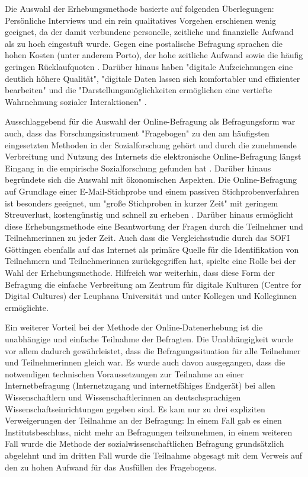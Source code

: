 Die Auswahl der Erhebungsmethode basierte auf folgenden Überlegungen: Persönliche Interviews und ein rein qualitatives Vorgehen erschienen wenig geeignet, da der damit verbundene personelle, zeitliche und finanzielle Aufwand als zu hoch eingestuft wurde. Gegen eine postalische Befragung sprachen die hohen Kosten (unter anderem Porto), der hohe zeitliche Aufwand sowie die häufig geringen Rücklaufquoten \cite{Petermann_2005}. Darüber hinaus haben "digitale Aufzeichnungen eine deutlich höhere Qualität", "digitale Daten lassen sich komfortabler und effizienter bearbeiten" und die "Darstellungsmöglichkeiten ermöglichen eine vertiefte Wahrnehmung sozialer Interaktionen" \cite{Hartung_2011}.

Ausschlaggebend für die Auswahl der Online-Befragung als Befragungsform war auch, dass das Forschungsinstrument "Fragebogen" zu den am häufigsten eingesetzten Methoden in der Sozialforschung gehört \cite{Raab-Steiner_2012} und durch die zunehmende Verbreitung und Nutzung des Internets die elektronische Online-Befragung längst Eingang in die empirische Sozialforschung gefunden hat \cite{Pannewitz_2002}. Darüber hinaus begründete sich die Auswahl mit ökonomischen Aspekten. Die Online-Befragung auf Grundlage einer E-Mail-Stichprobe und einem passiven Stichprobenverfahren ist besonders geeignet, um "große Stichproben in kurzer Zeit" \cite[:70]{Thielsch_2009} mit geringem Streuverlust, kostengünstig und schnell zu erheben \cite[:35]{Eichhorn_2004}. Darüber hinaus ermöglicht diese Erhebungsmethode eine Beantwortung der Fragen durch die Teilnehmer und Teilnehmerinnen zu jeder Zeit. Auch dass die Vergleichsstudie durch das SOFI Göttingen ebenfalls auf das Internet als primäre Quelle für die Identifikation von Teilnehmern und Teilnehmerinnen zurückgegriffen hat, spielte eine Rolle bei der Wahl der Erhebungsmethode. Hilfreich war weiterhin, dass diese Form der Befragung die einfache Verbreitung am Zentrum für digitale Kulturen (Centre for Digital Cultures) der Leuphana Universität und unter Kollegen und Kolleginnen ermöglichte.

Ein weiterer Vorteil bei der Methode der Online-Datenerhebung ist die unabhängige und einfache Teilnahme der Befragten. Die Unabhängigkeit wurde vor allem dadurch gewährleistet, dass die Befragungssituation für alle Teilnehmer und Teilnehmerinnen gleich war. Es wurde auch davon ausgegangen, dass die notwendigen technischen Voraussetzungen zur Teilnahme an einer Internetbefragung (Internetzugang und internetfähiges Endgerät) bei allen Wissenschaftlern und Wissenschaftlerinnen an deutschsprachigen Wissenschaftseinrichtungen gegeben sind. Es kam nur zu drei expliziten Verweigerungen der Teilnahme an der Befragung: In einem Fall gab es einen Institutsbeschluss, nicht mehr an Befragungen teilzunehmen, in einem weiteren Fall wurde die Methode der sozialwissenschaftlichen Befragung grundsätzlich abgelehnt und im dritten Fall wurde die Teilnahme abgesagt mit dem Verweis auf den zu hohen Aufwand für das Ausfüllen des Fragebogens.

